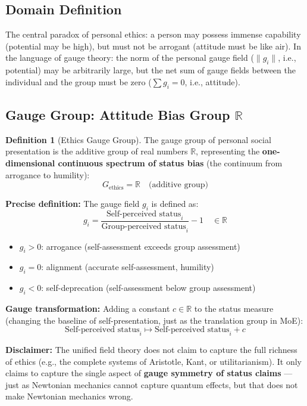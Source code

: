 \documentclass[12pt,a4paper]{article}
\theoremstyle{plain}
\theoremstyle{definition}
\newtheorem{definition}[theorem]{Definition}
\newcommand{\R}{\mathbb{R}}
\begin{document}
\subsection{Domain Definition}

The central paradox of personal ethics: a person may possess immense capability (potential may be high), but must not be arrogant
(attitude must be like air). In the language of gauge theory: the norm of the personal gauge field ($\|g_i\|$, i.e., potential)
may be arbitrarily large, but the net sum of gauge fields between the individual and the group must be zero ($\sum g_i = 0$, i.e., attitude).

\subsection{Gauge Group: Attitude Bias Group $\R$}

\begin{definition}[Ethics Gauge Group]
The gauge group of personal social presentation is the additive group of real numbers $\R$, representing the \textbf{one-dimensional continuous spectrum of status bias}
(the continuum from arrogance to humility):
\begin{equation}
    G_{\text{ethics}} = \R \quad \text{(additive group)}
\end{equation}

\textbf{Precise definition:} The gauge field $g_i$ is defined as:
\begin{equation}
    g_i = \frac{\text{Self-perceived status}_i}{\text{Group-perceived status}_i} - 1 \quad \in \R
\end{equation}
\begin{itemize}
    \item $g_i > 0$: arrogance (self-assessment exceeds group assessment)
    \item $g_i = 0$: alignment (accurate self-assessment, humility)
    \item $g_i < 0$: self-deprecation (self-assessment below group assessment)
\end{itemize}

\textbf{Gauge transformation:} Adding a constant $c \in \R$ to the status measure (changing the baseline of self-presentation, just as the translation group in MoE):
\begin{equation}
    \text{Self-perceived status}_i \mapsto \text{Self-perceived status}_i + c
\end{equation}

\textbf{Disclaimer:} The unified field theory does not claim to capture the full richness of ethics (e.g., the complete systems of Aristotle, Kant, or utilitarianism).
It only claims to capture the single aspect of \textbf{gauge symmetry of status claims} — just as Newtonian mechanics cannot capture quantum effects,
but that does not make Newtonian mechanics wrong.
\end{definition}
\end{document}
